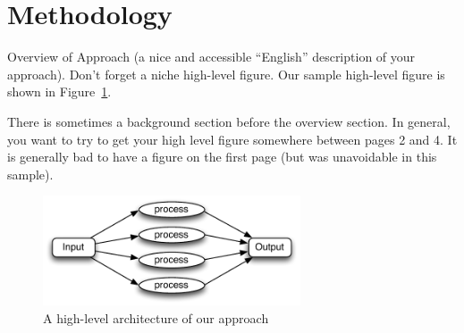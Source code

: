 \section{Methodology}
\label{sec:overview}

Overview of Approach (a nice and accessible ``English'' description of
your approach). Don't forget a niche high-level figure. Our sample
high-level figure is shown in Figure~\ref{fig:overview}.

There is sometimes a background section before the overview section. In
general, you want to try to get your high level figure somewhere between
pages 2 and 4. It is generally bad to have a figure on the first page
(but was unavoidable in this sample).

\begin{figure}[t]
  \centering
  \includegraphics[width=3in]{figs/overview}
  \caption{A high-level architecture of our approach}
  \label{fig:overview}
\end{figure}
